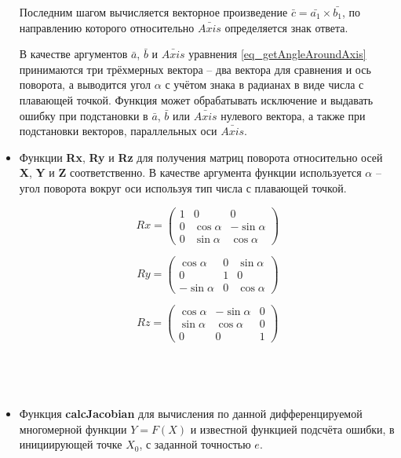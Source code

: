 \begin{itemize}
Последним шагом вычисляется векторное произведение $\bar{c} = \bar{a_1} \times \bar{b_1}$, по направлению которого относительно $\bar{Axis}$ определяется знак ответа.

В качестве аргументов $\bar{a}$, $\bar{b}$ и $\bar{Axis}$ уравнения \eqref{eq_getAngleAroundAxis} принимаются три трёхмерных вектора -- два вектора для сравнения и ось поворота, а выводится угол $\alpha$ с учётом знака в радианах в виде числа с плавающей точкой. Функция может обрабатывать исключение и выдавать ошибку при подстановки в $\bar{a}$, $\bar{b}$ или $\bar{Axis}$ нулевого вектора, а также при подстановки векторов, параллельных оси $\bar{Axis}$.

\item 
Функции \textbf{Rx}, \textbf{Ry} и \textbf{Rz} для получения матриц поворота относительно осей \textbf{X}, \textbf{Y} и \textbf{Z} соответственно. В качестве аргумента функции используется $\alpha$ -- угол поворота вокруг оси используя тип числа с плавающей точкой.

\begin{equation}
Rx =
\begin{pmatrix}
1 & 0 & 0\\
0 & \cos{\alpha} & -\sin{\alpha}\\
0 & \sin{\alpha} &  \cos{\alpha}
\end{pmatrix}
\end{equation}

\begin{equation}
Ry =
\begin{pmatrix}
 \cos{\alpha} & 0 & \sin{\alpha}\\
            0 & 1 & 0\\
-\sin{\alpha} & 0 & \cos{\alpha}
\end{pmatrix}
\end{equation}

\begin{equation}
Rz =
\begin{pmatrix}
\cos{\alpha} & -\sin{\alpha} & 0\\
\sin{\alpha} &  \cos{\alpha} & 0\\
0 & 0 & 1
\end{pmatrix}
\end{equation}

~

~

\item 
Функция \textbf{calcJacobian} для вычисления по данной дифференцируемой многомерной функции $Y = F(X)$ и известной функцией подсчёта ошибки, в инициирующей точке $X_0$, с заданной точностью $e$.


\end{itemize}
